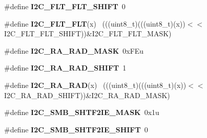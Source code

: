 \begin{DoxyCompactItemize}
\item 
\hypertarget{group___i2_c___register___masks_ga87c3021777b04e02f3c0481cdbde30e5}{}\#define {\bfseries I2\+C\+\_\+\+F\+L\+T\+\_\+\+F\+L\+T\+\_\+\+S\+H\+I\+F\+T}~0\label{group___i2_c___register___masks_ga87c3021777b04e02f3c0481cdbde30e5}

\item 
\hypertarget{group___i2_c___register___masks_ga631031ca92f64aab49d6b19e23d6bb4b}{}\#define {\bfseries I2\+C\+\_\+\+F\+L\+T\+\_\+\+F\+L\+T}(x)                                                  ~(((uint8\+\_\+t)(((uint8\+\_\+t)(x))$<$$<$I2\+C\+\_\+\+F\+L\+T\+\_\+\+F\+L\+T\+\_\+\+S\+H\+I\+F\+T))\&I2\+C\+\_\+\+F\+L\+T\+\_\+\+F\+L\+T\+\_\+\+M\+A\+S\+K)\label{group___i2_c___register___masks_ga631031ca92f64aab49d6b19e23d6bb4b}

\item 
\hypertarget{group___i2_c___register___masks_gaa39c37c0d41e4cdafc00884a2fc791fa}{}\#define {\bfseries I2\+C\+\_\+\+R\+A\+\_\+\+R\+A\+D\+\_\+\+M\+A\+S\+K}~0x\+F\+Eu\label{group___i2_c___register___masks_gaa39c37c0d41e4cdafc00884a2fc791fa}

\item 
\hypertarget{group___i2_c___register___masks_ga8571ae2c33f4ea6503f568c2151ef2a9}{}\#define {\bfseries I2\+C\+\_\+\+R\+A\+\_\+\+R\+A\+D\+\_\+\+S\+H\+I\+F\+T}~1\label{group___i2_c___register___masks_ga8571ae2c33f4ea6503f568c2151ef2a9}

\item 
\hypertarget{group___i2_c___register___masks_gad21c9c4b2971ca482c5b139359216021}{}\#define {\bfseries I2\+C\+\_\+\+R\+A\+\_\+\+R\+A\+D}(x)                                                    ~(((uint8\+\_\+t)(((uint8\+\_\+t)(x))$<$$<$I2\+C\+\_\+\+R\+A\+\_\+\+R\+A\+D\+\_\+\+S\+H\+I\+F\+T))\&I2\+C\+\_\+\+R\+A\+\_\+\+R\+A\+D\+\_\+\+M\+A\+S\+K)\label{group___i2_c___register___masks_gad21c9c4b2971ca482c5b139359216021}

\item 
\hypertarget{group___i2_c___register___masks_gad123ad3f9e1362d2ee5bd403cdf34327}{}\#define {\bfseries I2\+C\+\_\+\+S\+M\+B\+\_\+\+S\+H\+T\+F2\+I\+E\+\_\+\+M\+A\+S\+K}~0x1u\label{group___i2_c___register___masks_gad123ad3f9e1362d2ee5bd403cdf34327}

\item 
\hypertarget{group___i2_c___register___masks_ga431377427b6cae03a360309ac07a4559}{}\#define {\bfseries I2\+C\+\_\+\+S\+M\+B\+\_\+\+S\+H\+T\+F2\+I\+E\+\_\+\+S\+H\+I\+F\+T}~0\label{group___i2_c___register___masks_ga431377427b6cae03a360309ac07a4559}


\end{DoxyCompactItemize}
